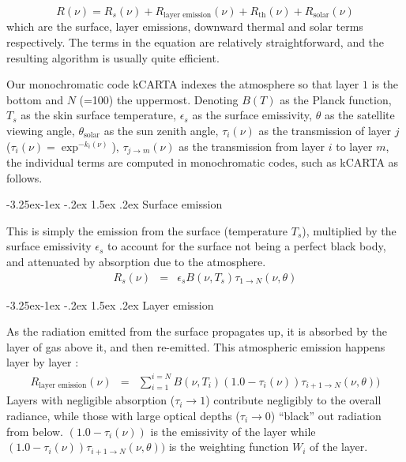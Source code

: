 \documentclass[11pt]{article}
\makeatletter
\newcommand{\kc}{\textsf{kCARTA}\xspace}
\renewcommand{\subsection}{\@startsection{subsection}{2}{\z@}%
                                     {-3.25ex\@plus -1ex \@minus -.2ex}%
                                     {1.5ex \@plus .2ex}%
                                     {\reset@font\normalsize\bfseries}}
\makeatother
\begin{document}
\begin{equation}
  R(\nu) = R_{s}(\nu) + R_{\text{layer emission}}(\nu) + R_{\text{th}}(\nu) + R_{\text{solar}}(\nu)
  \label{eqn:sch_detail}
\end{equation}
which are the surface, layer emissions, downward thermal and solar
terms respectively. The terms in the equation are relatively
straightforward, and the resulting algorithm is usually quite
efficient.

Our monochromatic code \kc indexes the atmosphere so that layer $1$ is
the bottom and $N$ (=100) the uppermost. Denoting $B(T)$ as the Planck
function, $T_{s}$ as the skin surface temperature, $\epsilon_{s}$ as
the surface emissivity, $\theta$ as the satellite viewing angle,
$\theta_{\text{solar}}$ as the sun zenith angle, $\tau_{i}(\nu)$ as
the transmission of layer $j$ ($\tau_{i}(\nu) = \exp^{-k_{i}(\nu)}$),
$\tau_{j \rightarrow m}(\nu)$ as the transmission from layer $i$ to
layer $m$, the individual terms are computed in monochromatic codes,
such as \kc as follows.

\subsection{Surface emission}

This is simply the emission from the surface (temperature $T_{s}$),
multiplied by the surface emissivity $\epsilon_{s}$ to account for the
surface not being a perfect black body, and attenuated by absorption
due to the atmosphere.
\begin{eqnarray*}
  R_{s}(\nu) & = & \epsilon_{s} B(\nu,T_{s}) \tau_{1 \rightarrow N}(\nu,\theta)
\end{eqnarray*}

\subsection{Layer emission}

As the radiation emitted from the surface propagates up, it is
absorbed by the layer of gas above it, and then re-emitted. This
atmospheric emission happens layer by layer :
\begin{eqnarray*}
  R_{\text{layer emission}}(\nu) & = & \sum_{i=1}^{i=N} B(\nu,T_{i})
  (1.0 - \tau_{i}(\nu)) \tau_{i+1 \rightarrow N}(\nu,\theta))
\end{eqnarray*}
Layers with negligible absorption ($\tau_{i} \rightarrow 1$)
contribute negligibly to the overall radiance, while those with large
optical depths ($\tau_{i} \rightarrow 0$) ``black'' out radiation from
below.  $(1.0 - \tau_{i}(\nu))$ is the emissivity of the layer while
$(1.0 - \tau_{i}(\nu)) \tau_{i+1 \rightarrow N}(\nu,\theta))$ is the
weighting function $W_{i}$ of the layer.
\end{document}
